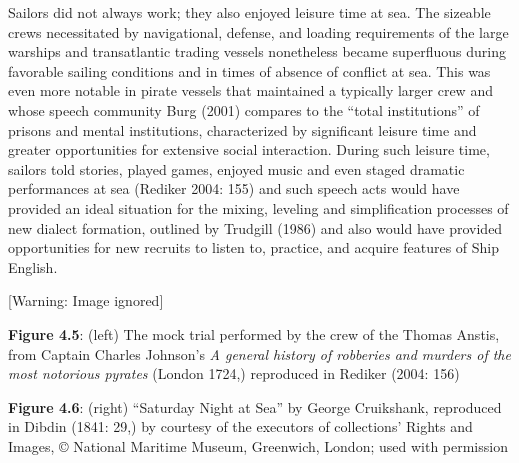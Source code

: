 \begin{styleStandard}
Sailors did not always work; they also enjoyed leisure time at sea. The sizeable crews necessitated by navigational, defense, and loading requirements of the large warships and transatlantic trading vessels nonetheless became superfluous during favorable sailing conditions and in times of absence of conflict at sea. This was even more notable in pirate vessels that maintained a typically larger crew and whose speech community Burg (2001) compares to the “total institutions” of prisons and mental institutions, characterized by significant leisure time and greater opportunities for extensive social interaction. During such leisure time, sailors told stories, played games, enjoyed music and even staged dramatic performances at sea (Rediker 2004: 155) and such speech acts would have provided an ideal situation for the mixing, leveling and simplification processes of new dialect formation, outlined by Trudgill (1986) and also would have provided opportunities for new recruits to listen to, practice, and acquire features of Ship English.
\end{styleStandard}


\begin{styleStandard}
  [Warning: Image ignored] %
 
\end{styleStandard}


\begin{center}
 [Warning: Image ignored] %

\end{center}
\begin{styleStandard}
\textbf{Figure 4.5}: (left) The mock trial performed by the crew of the Thomas Anstis, from Captain Charles Johnson’s \textit{A general history of robberies and murders of the most notorious pyrates }(London 1724,) reproduced in Rediker (2004: 156) 
\end{styleStandard}


\begin{styleStandard}
\textbf{Figure 4.6}: (right) “Saturday Night at Sea” by George Cruikshank, reproduced in Dibdin (1841: 29,) by courtesy of the executors of collections’ Rights and Images, © National Maritime Museum, Greenwich, London; used with permission
\end{styleStandard}


